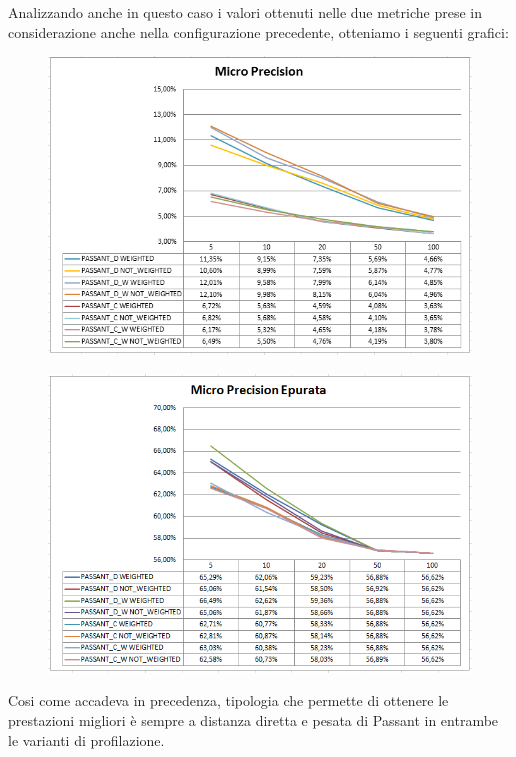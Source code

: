 Analizzando anche in questo caso i valori ottenuti nelle due metriche prese in considerazione anche nella configurazione precedente, otteniamo i seguenti grafici:
\begin{figure}[H]
	\includegraphics[width=.9\textwidth]{./images/graphs/micro_prec_Musto}
\end{figure}

\begin{figure}[H]
	\includegraphics[width=.9\textwidth]{./images/graphs/micro_precT_Musto}
\end{figure}
Cosi come accadeva in precedenza, tipologia che permette di ottenere le prestazioni migliori è sempre a distanza diretta e pesata di Passant in entrambe le varianti di profilazione.


